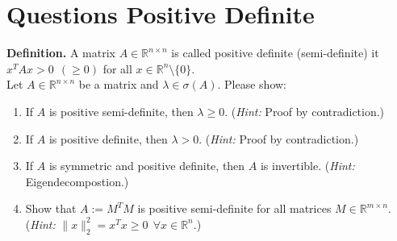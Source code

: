 \section{Questions Positive Definite}
\textbf{Definition.} A matrix $A\in \mathbb{R}^{n\times n}$ is called positive definite (semi-definite) it $x^TAx > 0 ~~(\geq 0)$ for all $x \in \mathbb{R}^n\setminus\{0\}$.\\[10pt]
Let $A\in \mathbb{R}^{n\times n}$ be a matrix and $\lambda \in \sigma(A)$. Please show:
\begin{enumerate}
	\item If $A$ is positive semi-definite, then $\lambda \geq 0$. (\textit{Hint:} Proof by contradiction.)
	\item If $A$ is positive definite, then $\lambda > 0$. (\textit{Hint:} Proof by contradiction.)
	\item If $A$ is symmetric and positive definite, then $A$ is invertible. (\textit{Hint:} Eigendecompostion.)
	\item Show that $A :=M^TM$ is positive semi-definite for all matrices $M \in \mathbb{R}^{m\times n}$. \\(\textit{Hint:} $\|x\|_2^2 = x^Tx \geq 0 ~~\forall x \in \mathbb{R}^n$.)
\end{enumerate}